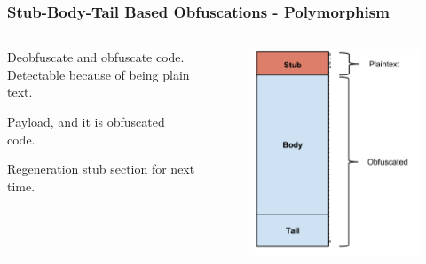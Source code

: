 \documentclass{beamer}
\begin{document}
\begin{frame}[plain]
	\frametitle{Stub-Body-Tail Based Obfuscations - Polymorphism}
	\begin{columns}[c] %

\begin{description}
	\small
	\item[Stub] Deobfuscate and obfuscate code. Detectable because of being plain text.
	\item[Body] Payload, and it is obfuscated code.
	\item[Tail] Regeneration stub section for next time.
\end{description}

	\begin{figure}
		\includegraphics[width=1\linewidth]{img/code_illustration.png}
	\end{figure}
\end{columns}
\end{frame}
\end{document}
